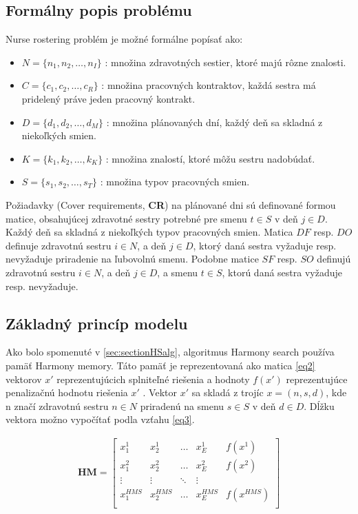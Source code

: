 \documentclass[a4paper, 14pt]{article}
\begin{document}
\subsection{Formálny popis problému}
Nurse rostering problém je možné formálne popísať ako:
\begin{itemize}
\item $N = \{n_1, n_2, \dots, n_I \} $ : množina zdravotných sestier, ktoré majú rôzne znalosti.
\item $C = \{c_1, c_2, \dots, c_R \} $ : množina pracovných kontraktov, každá sestra má pridelený práve jeden pracovný kontrakt.
\item $D = \{d_1, d_2, \dots, d_M \} $ : množina plánovaných dní, každý deň sa skladná z niekoľkých smien.
\item $K = \{k_1, k_2, \dots, k_K \} $ : množina znalostí, ktoré môžu sestru nadobúdať.
\item $S = \{s_1, s_2, \dots, s_T \} $ : množina typov pracovných smien.
\end{itemize}
Požiadavky (Cover requirements, \textbf{CR}) na plánované dni sú definované formou matice, obsahujúcej zdravotné sestry potrebné pre smenu $t \in S$ v deň $j \in D$. Každý deň sa skladná z niekoľkých typov pracovných smien. Matica $DF$ resp. $DO$ definuje zdravotnú sestru $i \in N$, a deň  $j \in D$, ktorý daná sestra vyžaduje resp. nevyžaduje priradenie na ľubovolnú smenu. Podobne matice $SF$ resp. $SO$ definujú zdravotnú sestru $i \in N$, a deň  $j \in D$, a smenu $t \in S$, ktorú daná sestra vyžaduje resp. nevyžaduje.\\

\subsection{Základný princíp modelu}
Ako bolo spomenuté v \ref{sec:sectionHSalg}, algoritmus Harmony search používa pamäť Harmony memory. Táto pamäť je reprezentovaná ako matica \ref{eq2} vektorov $x'$ reprezentujúcich splniteľné riešenia a  hodnoty $f(x')$ reprezentujúce penalizačnú hodnotu riešenia $x'$ . Vektor $x'$ sa skladá z trojíc $x = (n,s,d)$, kde n značí zdravotnú sestru $n \in N$ priradenú na smenu $s \in S$ v deň $d \in D$. Dĺžku vektora možno vypočítať podla vzťahu \ref{eq3}.   

\begin{center}
\begin{eqnarray}
\label{eq2}
\mathbf{HM}=\left[
\begin{array}{ccccc}
x_1^1 & x_2^1 & \ldots & x_E^1 & f(x^1)\\
x_1^2 & x_2^2 & \ldots & x_E^2 & f(x^2) \\
\vdots & \vdots & \ddots & \vdots \\
x_1^{HMS} & x_2^{HMS} & \ldots & x_E^{HMS} & f(x^{HMS})\\
\end{array}\right]
\end{eqnarray}
\end{center}
\end{document}
